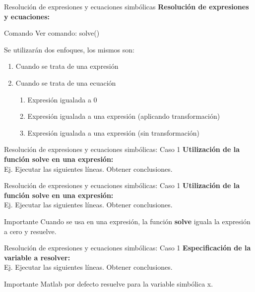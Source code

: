 \documentclass{bredelebeamer}
\begin{document}
\begin{frame}{Resolución de expresiones y ecuaciones simbólicas}
\textbf{Resolución de expresiones y ecuaciones:}
\begin{exampleblock}{Comando}
Ver comando: solve()
\end{exampleblock}
Se utilizarán dos enfoques, los mismos son:
\begin{enumerate}
\item Cuando se trata de una expresión
\item Cuando se trata de una ecuación
\begin{enumerate}
\item Expresión igualada a 0
\item Expresión igualada a una expresión (aplicando transformación)
\item Expresión igualada a una expresión (sin transformación)
\end{enumerate}
\end{enumerate}
\end{frame}

\begin{frame}{Resolución de expresiones y ecuaciones simbólicas: Caso 1}
\textbf{Utilización de la función solve en una expresión:}\\
Ej. Ejecutar las siguientes líneas. Obtener conclusiones.

\end{frame}

\begin{frame}{Resolución de expresiones y ecuaciones simbólicas: Caso 1}
\textbf{Utilización de la función solve en una expresión:}\\
Ej. Ejecutar las siguientes líneas. Obtener conclusiones.

\begin{alertblock}{Importante}
Cuando se usa en una expresión, la función \textbf{solve} iguala la expresión a cero y resuelve.
\end{alertblock}
\end{frame}

\begin{frame}{Resolución de expresiones y ecuaciones simbólicas: Caso 1}
\textbf{Especificación de la variable a resolver:}\\
Ej. Ejecutar las siguientes líneas. Obtener conclusiones.

\begin{alertblock}{Importante}
Matlab por defecto resuelve para la variable simbólica x. 
\end{alertblock}
\end{frame}
\end{document}
